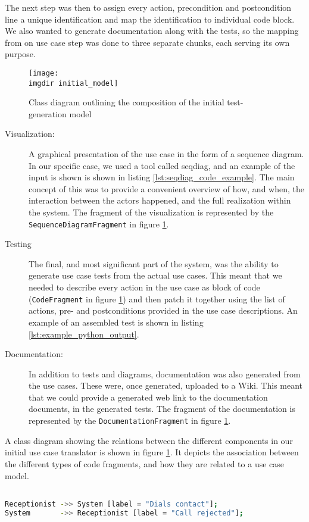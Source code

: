 \noindent The next step was then to assign every action, precondition and postcondition line a unique identification and map the identification to individual code block. We also wanted to generate documentation along with the tests, so the mapping from on use case step was done to three separate chunks, each serving its own purpose.
\begin{figure}[!htbp]
\centering
\texttt{[image: \\imgdir initial\_model]}
\caption{Class diagram outlining the composition of the initial test-generation model}
\label{fig:first_generation_model}
\end{figure}
\begin{description}

  \item[Visualization:] A graphical presentation of the use case in the form of a sequence diagram. In our specific case, we used a tool called seqdiag, and an example of the input is shown is shown in listing \ref{lst:seqdiag_code_example}. The main concept of this was to provide a convenient overview of how, and when, the interaction between the actors happened, and the full realization within the system. The fragment of the visualization is represented by the \texttt{SequenceDiagramFragment} in figure \ref{fig:first_generation_model}.

  \item[Testing] The final, and most significant part of the system, was the ability to generate use case tests from the actual use cases. This meant that we needed to describe every action in the use case as block of code (\texttt{CodeFragment} in figure \ref{fig:first_generation_model}) and then patch it together using the list of actions, pre- and postconditions provided in the use case descriptions. An example of an assembled test is shown in listing \ref{lst:example_python_output}.

  \item[Documentation:] In addition to tests and diagrams, documentation was also generated from the use cases. These were, once generated, uploaded to a Wiki. This meant that we could provide a generated web link to the documentation documents, in the generated tests. The fragment of the documentation is represented by the \texttt{DocumentationFragment} in figure \ref{fig:first_generation_model}.
\end{description}
\noindent
A class diagram showing the relations between the different components in our initial use case translator is shown in figure \ref{fig:first_generation_model}. It depicts the association between the different types of code fragments, and how they are related to a use case model.
\begin{lstlisting}[language=Bash, caption=Example seqdiag input fragment, label=lst:seqdiag_code_example]

Receptionist ->> System [label = "Dials contact"];
System       ->> Receptionist [label = "Call rejected"];
\end{lstlisting}

